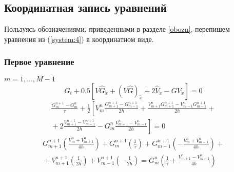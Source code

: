 \subsection{Координатная запись уравнений}
Пользуясь обозначениями, приведенными в разделе \ref{obozn}, перепишем уравнения из (\ref{system:4}) в координатном виде.

\subsubsection*{Первое уравнение}
$m = 1,\dots, M - 1$
\begin{equation*}
  G_t + 0.5 [
    V \hat G_{\mathring{x}} + (V \hat G)_{\mathring{x}} +
    2 \hat V_{\mathring{x}} - G V_{\mathring{x}} ] = 0 
\end{equation*}
\begin{multline*}
  \frac{G_{m}^{n+1} - G_{m}^{n}}{\tau} + \frac12 \left[
    V_{m}^{n} \frac{G_{m+1}^{n+1} - G_{m-1}^{n+1}}{2h} +
    \frac{V_{m+1}^{n} G_{m+1}^{n+1} - V_{m-1}^{n} G_{m-1}^{n+1}}{2h} 
    \right. +{} \\ {}+ \left.
    2 \frac{V_{m+1}^{n+1} - V_{m-1}^{n+1}}{2h} -
    G_{m}^{n}\frac{V_{m+1}^{n} - V_{m-1}^{n}}{2h}
  \right] = 0
\end{multline*}
\begin{multline*}
  G_{m+1}^{n+1} \left( \frac{V_{m}^{n} + V_{m+1}^{n}}{4h} \right) +
  G_{m}^{n+1}   \left( \frac{1}{\tau} \right) +
  G_{m-1}^{n+1} \left(-\frac{V_{m}^{n} + V_{m-1}^{n}}{4h} \right)
  +{} \\ {}+
  V_{m+1}^{n+1} \left( \frac{1}{2h} \right) +
  V_{m-1}^{n+1} \left(-\frac{1}{2h} \right) =
  G_{m}^{n} \left( \frac{1}{\tau} + \frac{V_{m+1}^{n} - V_{m-1}^{n}}{4h} \right) 
\end{multline*}


